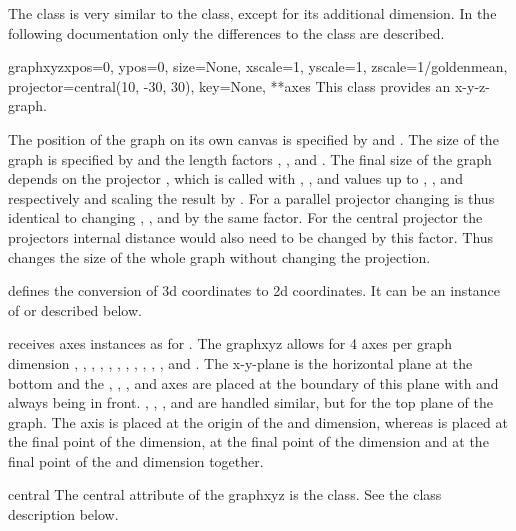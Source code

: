 The class  is very similar to the 
class, except for its additional dimension. In the following
documentation only the differences to the  class are
described.

\begin{classdesc}{graphxyz}{xpos=0, ypos=0, size=None,
                            xscale=1, yscale=1, zscale=1/goldenmean,
                            projector=central(10, -30, 30), key=None,
                            **axes}
  This class provides an x-y-z-graph.

  The position of the graph on its own canvas is specified by
   and . The size of the graph is specified by
   and the length factors , , and
  . The final size of the graph depends on the projector
  , which is called with , , and
   values up to , , and  
  respectively and scaling the result by . For a parallel
  projector changing  is thus identical to changing
  , , and  by the same factor. For
  the central projector the projectors internal distance would also
  need to be changed by this factor. Thus  changes the size
  of the whole graph without changing the projection.

   defines the conversion of 3d coordinates to 2d
  coordinates. It can be an instance of  or
   described below.

   receives axes instances as for . The
  graphxyz allows for 4 axes per graph dimension , ,
  , , , , , ,
  , , , and . The x-y-plane is the
  horizontal plane at the bottom and the , ,
  , and  axes are placed at the boundary of this
  plane with  and  always being in front. ,
  , , and  are handled similar, but for the
  top plane of the graph. The  axis is placed at the origin of
  the  and  dimension, whereas  is placed at
  the final point of the  dimension,  at the final
  point of the  dimension and  at the final point of
  the  and  dimension together.
\end{classdesc}

\begin{memberdesc}{central}
  The central attribute of the graphxyz is the  class.
  See the class description below.
\end{memberdesc}

